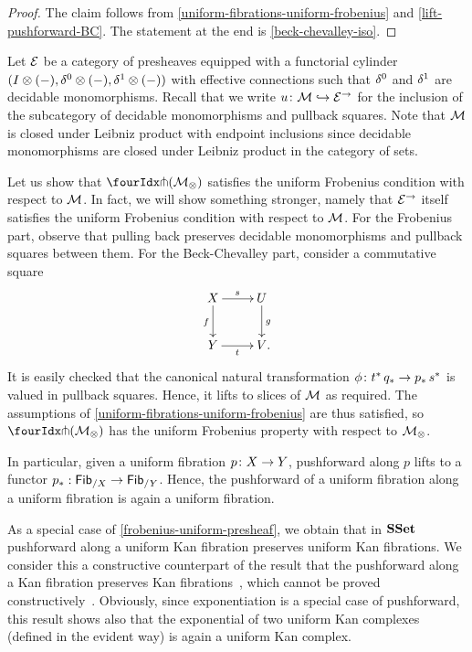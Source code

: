 \documentclass[reqno,10pt,a4paper,oneside,draft]{amsart}
\begin{document}
\begin{proof}
The claim follows from \cref{uniform-fibrations-uniform-frobenius} and \cref{lift-pushforward-BC}.
The statement at the end is \cref{beck-chevalley-iso}.
\end{proof}

\begin{example} \label{frobenius-uniform-presheaf}
Let $\catE$ be a category of presheaves equipped with a functorial cylinder $(\interval \otimes (-), \lcyl \otimes (-), \rcyl \otimes (-))$ with effective connections such that $\lcyl$ and $\rcyl$ are decidable monomorphisms.
Recall that we write $u \co \cal{M} \hookrightarrow \catE^\to$ for the inclusion of the subcategory of decidable monomorphisms and pullback squares.
Note that $\cal{M}$ is closed under Leibniz product with endpoint inclusions since decidable monomorphisms are closed under Leibniz product in the category of sets.

Let us show that $\liftr{(\cal{M}_\otimes)}$ satisfies the uniform Frobenius condition with respect to $\cal{M}$.
In fact, we will show something stronger, namely that $\catE^\to$ itself satisfies the uniform Frobenius condition with respect to $\cal{M}$.
For the Frobenius part, observe that pulling back preserves decidable monomorphisms and pullback squares between them.
For the Beck-Chevalley part, consider a commutative square
\[
\xymatrix{
  X
  \ar[d]_{f}
  \ar[r]^{s}
&
  U
  \ar[d]^{g}
\\
  Y
  \ar[r]_{t}
&
  V
\rlap{.}}
\]
It is easily checked that the canonical natural transformation $\phi \co t^* \, q_* \to p_* \, s^*$ is valued in pullback squares.
Hence, it lifts to slices of $\cal{M}$ as required.
The assumptions of \cref{uniform-fibrations-uniform-frobenius} are thus satisfied, so $\liftr{(\cal{M}_\otimes)}$ has the uniform Frobenius property with respect to $\cal{M}_\otimes$.

In particular, given a uniform fibration $p \co X \to Y$, pushforward along $p$ lifts to a functor $p_* : \Fib_{/X} \to \Fib_{/Y}$.
Hence, the pushforward of a uniform fibration along a uniform fibration is again a uniform fibration.
\end{example}

\begin{example}
As a special case of \cref{frobenius-uniform-presheaf}, we obtain that in $\SSet$ pushforward along a uniform Kan fibration preserves uniform Kan fibrations.
We consider this a constructive counterpart of the result that the pushforward along a Kan fibration preserves Kan fibrations~\cite{voevodsky-simplicial-model}, which cannot be proved constructively~\cite{coquand-non-constructivity-kan}.
Obviously, since exponentiation is a special case of pushforward, this result shows also that the exponential of two uniform Kan complexes (defined in the evident way) is again a uniform Kan complex.
\end{example}
\end{document}
